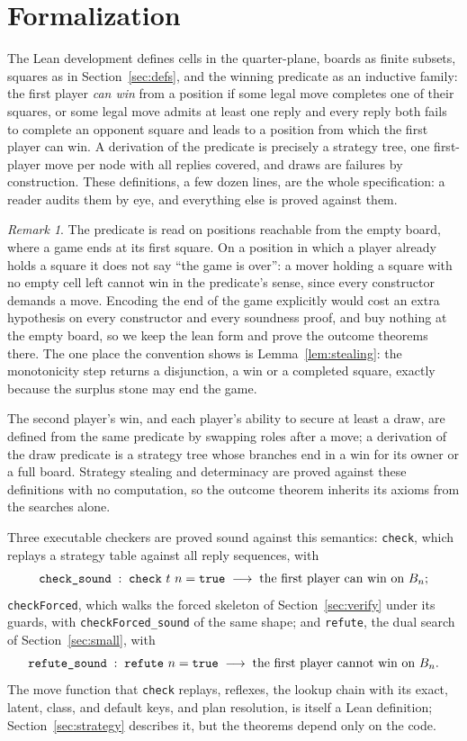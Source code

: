 \documentclass[11pt]{amsart}
\theoremstyle{definition}
\theoremstyle{remark}
\newtheorem{remark}[theorem]{Remark}
\begin{document}
\section{Formalization}\label{sec:lean}

The Lean development defines cells in the quarter-plane, boards as
finite subsets, squares as in Section~\ref{sec:defs}, and the winning
predicate as an inductive family: the first player \emph{can win} from
a position if some legal move completes one of their squares, or some
legal move admits at least one reply and every reply both fails to
complete an opponent square and leads to a position from which the
first player can win. A derivation of the predicate is precisely a
strategy tree, one first-player move per node with all replies
covered, and draws are failures by construction. These definitions,
a few dozen lines, are the whole specification: a reader audits them
by eye, and everything else is proved against them.

\begin{remark}\label{rem:terminal}
The predicate is read on positions reachable from the empty board,
where a game ends at its first square. On a position in which a
player already holds a square it does not say ``the game is over'':
a mover holding a square with no empty cell left cannot win in the
predicate's sense, since every constructor demands a move. Encoding
the end of the game explicitly would cost an extra hypothesis on
every constructor and every soundness proof, and buy nothing at the
empty board, so we keep the lean form and prove the outcome theorems
there. The one place the convention shows is
Lemma~\ref{lem:stealing}: the monotonicity step returns a disjunction,
a win or a completed square, exactly because the surplus stone may
end the game.
\end{remark}

The second player's win, and each player's ability to secure at least
a draw, are defined from the same predicate by swapping roles after a
move; a derivation of the draw predicate is a strategy tree whose
branches end in a win for its owner or a full board. Strategy
stealing and determinacy are proved against these definitions with no
computation, so the outcome theorem inherits its axioms from the
searches alone.

Three executable checkers are proved sound against this
semantics: \texttt{check}, which replays a strategy table against
all reply sequences, with
\[
  \texttt{check\_sound} \;:\;
  \texttt{check}\ t\ n = \texttt{true}
  \;\longrightarrow\; \text{the first player can win on } B_n;
\]
\texttt{checkForced}, which walks the forced skeleton of
Section~\ref{sec:verify} under its guards, with
\texttt{checkForced\_sound} of the same shape; and \texttt{refute},
the dual search of Section~\ref{sec:small}, with
\[
  \texttt{refute\_sound} \;:\;
  \texttt{refute}\ n = \texttt{true}
  \;\longrightarrow\; \text{the first player cannot win on } B_n.
\]
The move function that \texttt{check} replays, reflexes, the lookup
chain with its exact, latent, class, and default keys, and plan
resolution, is itself a Lean definition; Section~\ref{sec:strategy}
describes it, but the theorems depend only on the code.
\end{document}
